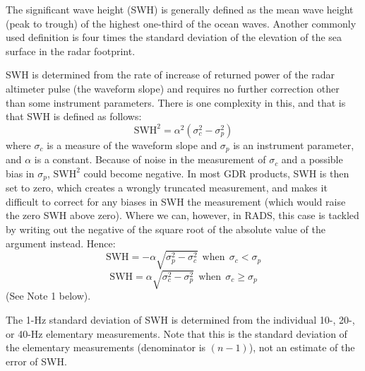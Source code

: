 \documentclass[a4paper,11pt,openany,natbib,nomargin]{thesis}
\begin{document}
The significant wave height (SWH) is generally defined as the mean wave height (peak to trough) of the highest one-third of the ocean waves. Another commonly used definition is four times the standard deviation of the elevation of the sea surface in the radar footprint.

SWH is determined from the rate of increase of returned power of the radar altimeter pulse (the waveform slope) and requires no further correction other than some instrument parameters. There is one complexity in this, and that is that SWH is defined as follows:
$$ \mathrm{SWH}^2 = \alpha^2 (\sigma_c^2 - \sigma_p^2) $$
where $\sigma_c$ is a measure of the waveform slope and $\sigma_p$ is an instrument parameter, and $\alpha$ is a constant. Because of noise in the measurement of $\sigma_c$ and a possible bias in $\sigma_p$, $\mathrm{SWH}^2$ could become negative. In most GDR products, SWH is then set to zero, which creates a wrongly truncated measurement, and makes it difficult to correct for any biases in SWH the measurement (which would raise the zero SWH above zero). Where we can, however, in RADS, this case is tackled by writing out the negative of the square root of the absolute value of the argument instead. Hence:
$$ \mathrm{SWH} = - \alpha \sqrt{\sigma_p^2 - \sigma_c^2} \mathrm{~~when~~} \sigma_c < \sigma_p $$
$$ \mathrm{SWH} = \alpha \sqrt{\sigma_c^2 - \sigma_p^2} \mathrm{~~when~~} \sigma_c \ge \sigma_p $$
(See Note 1 below).

The 1-Hz standard deviation of SWH is determined from the individual 10-, 20-, or 40-Hz elementary measurements. Note that this is the standard deviation of the elementary measurements (denominator is $(n-1)$), not an estimate of the error of SWH.
\end{document}
